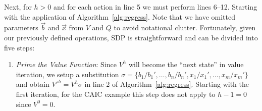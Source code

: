\documentclass[twoside,11pt]{article}
\begin{document}
Next, for $h > 0$ and for each action in line 5 we must perform lines 6--12. Starting with the application of Algorithm~\ref{alg:regress}.  Note that we have omitted parameters $\vec{b}$ and
$\vec{x}$ from $V$ and $Q$ to avoid notational clutter.
Fortunately, given our previously defined
operations, SDP is straightforward and can be divided into five 
steps: 
\begin{enumerate}
\item {\it Prime the Value Function}: Since $V^{h}$ will become
the ``next state'' in value iteration, we setup a substitution
$\sigma = \{ b_1 / b_1', \ldots, b_n / b_n', x_1 / x_1', \ldots, x_m / x_m' \}$
and obtain $V'^{h} = V^{h}\sigma$ in line 2 of Algorithm~\ref{alg:regress}. Starting with the first iteration, for the \textsc{CAIC} example this step does not apply to $h-1=0$ since $V^0=0$.


\end{enumerate}
\end{document}
